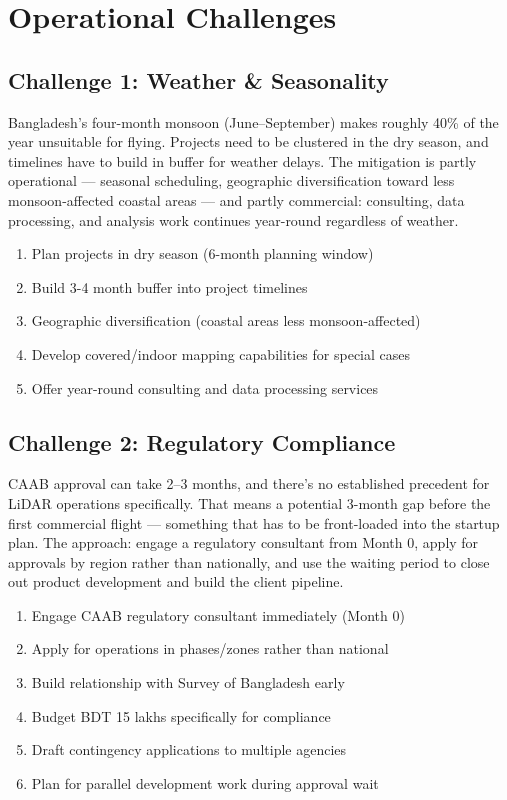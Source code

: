\section{Operational Challenges}

\subsection{Challenge 1: Weather \& Seasonality}

Bangladesh's four-month monsoon (June--September) makes roughly 40\% of the year unsuitable for flying. Projects need to be clustered in the dry season, and timelines have to build in buffer for weather delays. The mitigation is partly operational --- seasonal scheduling, geographic diversification toward less monsoon-affected coastal areas --- and partly commercial: consulting, data processing, and analysis work continues year-round regardless of weather.

\begin{enumerate}
    \item Plan projects in dry season (6-month planning window)
    \item Build 3-4 month buffer into project timelines
    \item Geographic diversification (coastal areas less monsoon-affected)
    \item Develop covered/indoor mapping capabilities for special cases
    \item Offer year-round consulting and data processing services
\end{enumerate}

\subsection{Challenge 2: Regulatory Compliance}

CAAB approval can take 2--3 months, and there's no established precedent for LiDAR operations specifically. That means a potential 3-month gap before the first commercial flight --- something that has to be front-loaded into the startup plan. The approach: engage a regulatory consultant from Month 0, apply for approvals by region rather than nationally, and use the waiting period to close out product development and build the client pipeline.

\begin{enumerate}
    \item Engage CAAB regulatory consultant immediately (Month 0)
    \item Apply for operations in phases/zones rather than national
    \item Build relationship with Survey of Bangladesh early
    \item Budget BDT 15 lakhs specifically for compliance
    \item Draft contingency applications to multiple agencies
    \item Plan for parallel development work during approval wait
\end{enumerate}

